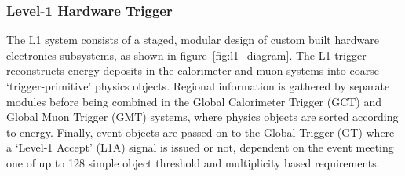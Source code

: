 \subsubsection{Level-1 Hardware Trigger}

The L1 system consists of a staged, modular design of custom built hardware 
electronics subsystems, as shown in figure~\ref{fig:l1_diagram}. 
The L1 trigger reconstructs energy deposits in the calorimeter and muon systems
into coarse `trigger-primitive' physics objects.
Regional information is gathered by separate modules 
before being combined in the Global Calorimeter Trigger (GCT) and Global Muon 
Trigger (GMT) systems, where physics objects are sorted according to energy. 
Finally, event objects are passed on to the Global Trigger (GT) where a 
`Level-1 Accept' (L1A) signal is issued or not, dependent on the event meeting 
one of up to 128 simple object threshold and multiplicity based requirements.

